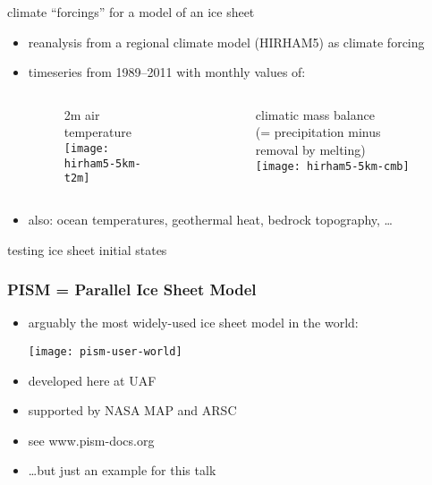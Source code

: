 \documentclass[hide notes,intlimits]{beamer}
\begin{document}
\begin{frame}{climate ``forcings'' for a model of an ice sheet}
  \begin{itemize}
  \item reanalysis from a regional climate model \scriptsize (HIRHAM5) \normalsize as climate forcing
  \item timeseries from 1989--2011 with monthly values of:

  \bigskip

 \begin{columns}[c]
    \begin{column}{.5\linewidth}
      \vspace{-.5cm}
      \begin{figure}
        2m air temperature \phantom{$\bigg|$} \\
        \texttt{[image: hirham5-5km-t2m]}
     \end{figure}
    \end{column}
    \begin{column}{.5\linewidth}
      \vspace{-.5cm}
      \begin{figure}
        climatic mass balance\\
        \scriptsize (= precipitation minus removal by melting) \normalsize\\
        \texttt{[image: hirham5-5km-cmb]}
     \end{figure}
    \end{column}
  \end{columns}

  \item also: ocean temperatures, geothermal heat, bedrock topography, \dots
  \end{itemize}
\end{frame}


\begin{frame}{testing ice sheet initial states}
  \begin{figure}
    
  \end{figure}
\end{frame}


\begin{frame}
  \frametitle{PISM = Parallel Ice Sheet Model}

  \begin{itemize}
  \item arguably the most widely-used ice sheet model in the world:
     \begin{center}
        \texttt{[image: pism-user-world]}
     \end{center}
  \item developed here at UAF
  \item supported by NASA MAP and ARSC
  \item see \alert{www.pism-docs.org}
  \item \dots but just an example for this talk
  \end{itemize}
\end{frame}
\end{document}
